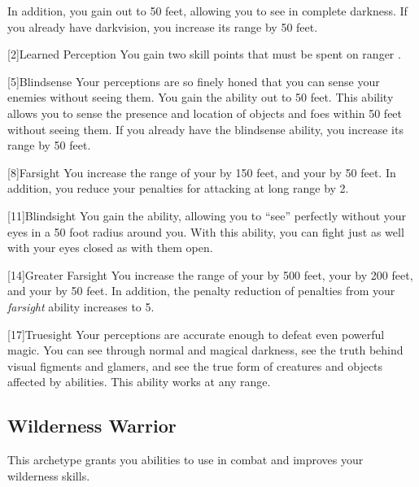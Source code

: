         In addition, you gain  out to 50 feet, allowing you to see in complete darkness.
        If you already have darkvision, you increase its range by 50 feet.

        [2]{Learned Perception} You gain two skill points that must be spent on ranger .

        [5]{Blindsense}
        Your perceptions are so finely honed that you can sense your enemies without seeing them.
        You gain the  ability out to 50 feet.
        This ability allows you to sense the presence and location of objects and foes within 50 feet without seeing them.
        If you already have the blindsense ability, you increase its range by 50 feet.

        [8]{Farsight}
        You increase the range of your  by 150 feet, and your  by 50 feet.
        In addition, you reduce your  penalties for attacking at long range by 2.

        [11]{Blindsight}
        You gain the  ability, allowing you to ``see'' perfectly without your eyes in a 50 foot radius around you.
        With this ability, you can fight just as well with your eyes closed as with them open.

        [14]{Greater Farsight}
        You increase the range of your  by 500 feet, your  by 200 feet, and your  by 50 feet.
        In addition, the penalty reduction of  penalties from your \textit{farsight} ability increases to 5.

        [17]{Truesight} 
        Your perceptions are accurate enough to defeat even powerful magic.
        You can see through normal and magical darkness, see the truth behind visual figments and glamers, and see the true form of creatures and objects affected by  abilities.
        This ability works at any range.

    \subsection{Wilderness Warrior}
        This archetype grants you abilities to use in combat and improves your wilderness skills.

